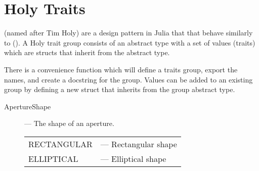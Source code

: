 
\section{Holy Traits}
\label{s:holy}

 (named after Tim Holy) are a design pattern in Julia that that behave similarly
to  (). A Holy trait group consists of an abstract type with a set of values
(traits) which are structs that inherit from the abstract type.

There is a convenience function  which will define a traits group, export the names,
and create a docstring for the group. Values can be added to an existing group by defining a 
new struct that inherits from the group abstract type.

\begin{description}
%
\item[ApertureShape] --- The shape of an aperture.\Newline 
\vspace*{-5pt}
\begin{tabular}{ll}
  RECTANGULAR & --- Rectangular shape \\
  ELLIPTICAL  & --- Elliptical shape \\
\end{tabular}
%
\end{description}



